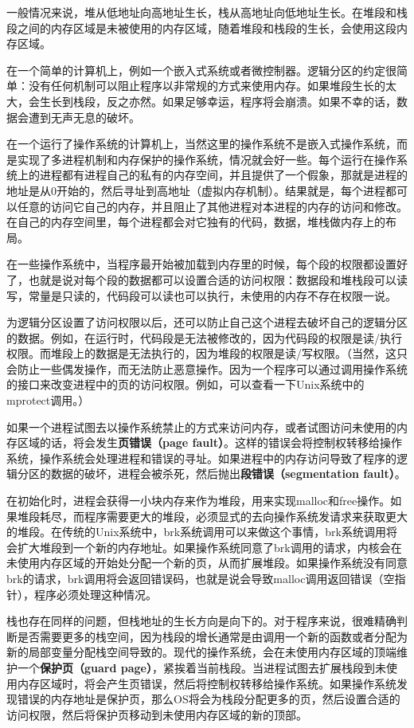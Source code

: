 \documentclass[cn,11pt,chinese]{elegantbook}
\begin{document}
一般情况来说，堆从低地址向高地址生长，栈从高地址向低地址生长。在堆段和栈段之间的内存区域是未被使用的内存区域，随着堆段和栈段的生长，会使用这段内存区域。

在一个简单的计算机上，例如一个嵌入式系统或者微控制器。逻辑分区的约定很简单：没有任何机制可以阻止程序以非常规的方式来使用内存。如果堆段生长的太大，会生长到栈段，反之亦然。如果足够幸运，程序将会崩溃。如果不幸的话，数据会遭到无声无息的破坏。

在一个运行了操作系统的计算机上，当然这里的操作系统不是嵌入式操作系统，而是实现了多进程机制和内存保护的操作系统，情况就会好一些。每个运行在操作系统上的进程都有进程自己的私有的内存空间，并且提供了一个假象，那就是进程的地址是从0开始的，然后寻址到高地址（虚拟内存机制）。结果就是，每个进程都可以任意的访问它自己的内存，并且阻止了其他进程对本进程的内存的访问和修改。在自己的内存空间里，每个进程都会对它独有的代码，数据，堆栈做内存上的布局。

在一些操作系统中，当程序最开始被加载到内存里的时候，每个段的权限都设置好了，也就是说对每个段的数据都可以设置合适的访问权限：数据段和堆栈段可以读写，常量是只读的，代码段可以读也可以执行，未使用的内存不存在权限一说。

为逻辑分区设置了访问权限以后，还可以防止自己这个进程去破坏自己的逻辑分区的数据。例如，在运行时，代码段是无法被修改的，因为代码段的权限是读/执行权限。而堆段上的数据是无法执行的，因为堆段的权限是读/写权限。（当然，这只会防止一些偶发操作，而无法防止恶意操作。因为一个程序可以通过调用操作系统的接口来改变进程中的页的访问权限。例如，可以查看一下Unix系统中的mprotect调用。）

如果一个进程试图去以操作系统禁止的方式来访问内存，或者试图访问未使用的内存区域的话，将会发生\textbf{页错误（page fault）}。这样的错误会将控制权转移给操作系统，操作系统会处理进程和错误的寻址。如果进程中的内存访问导致了程序的逻辑分区的数据的破坏，进程会被杀死，然后抛出\textbf{段错误（segmentation fault）}。

在初始化时，进程会获得一小块内存来作为堆段，用来实现malloc和free操作。如果堆段耗尽，而程序需要更大的堆段，必须显式的去向操作系统发请求来获取更大的堆段。在传统的Unix系统中，brk系统调用可以来做这个事情，brk系统调用将会扩大堆段到一个新的内存地址。如果操作系统同意了brk调用的请求，内核会在未使用内存区域的开始处分配一个新的页，从而扩展堆段。如果操作系统没有同意brk的请求，brk调用将会返回错误码，也就是说会导致malloc调用返回错误（空指针），程序必须处理这种情况。

栈也存在同样的问题，但栈地址的生长方向是向下的。对于程序来说，很难精确判断是否需要更多的栈空间，因为栈段的增长通常是由调用一个新的函数或者分配为新的局部变量分配栈空间导致的。现代的操作系统，会在未使用内存区域的顶端维护一个\textbf{保护页（guard page）}，紧挨着当前栈段。当进程试图去扩展栈段到未使用内存区域时，将会产生页错误，然后将控制权转移给操作系统。如果操作系统发现错误的内存地址是保护页，那么OS将会为栈段分配更多的页，然后设置合适的访问权限，然后将保护页移动到未使用内存区域的新的顶部。
\end{document}
